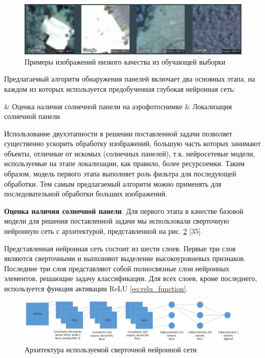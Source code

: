 \begin{figure}[ht]
	\centering
	\includegraphics[width=16cm]{man-source/images/ch4/pic4-16.png}
	\caption{Примеры изображений низкого качества из обучающей выборки}
	\label{fig:example_of_images}
\end{figure}

Предлагаемый алгоритм обнаружения панелей включает два основных этапа, на каждом из которых используется предобученная глубокая нейронная сеть: 

\begin{easylistNum}
    & Оценка наличия солнечной панели на аэрофотоснимке
    & Локализация солнечной панели
\end{easylistNum}

Использование двухэтапности в решении поставленной задачи позволяет существенно ускорить обработку изображений, большую часть которых занимают объекты, отличные от искомых (солнечных панелей), т.к. нейросетевые модели, используемые на этапе локализации, как правило, более ресурсоемки. Таким образом, модель первого этапа выполняет роль фильтра для последующей обработки. Тем самым предлагаемый алгоритм можно применять для последовательной обработки больших изображений.

\textbf{Оценка наличия солнечной панели}. Для первого этапа в качестве базовой модели для решения поставленной задачи мы использовали сверточную нейронную сеть с архитектурой, представленной на рис. \ref{fig:used_cnn} [35]. 

Представленная нейронная сеть состоит из шести слоев. Первые три слоя являются сверточными и выполняют выделение высокоуровневых признаков. Последние три слоя представляют собой полносвязные слои нейронных элементов, решающие задачу классификации. Для всех слоев, кроме последнего, используется функция активации ReLU \ref{eq:relu_function}.

\begin{figure}[ht]
	\centering
	\includegraphics[width=17cm]{man-source/images/ch4/pic4-19.jpg}
	\caption{Архитектура используемой сверточной нейронной сети}
	\label{fig:used_cnn}
\end{figure}

